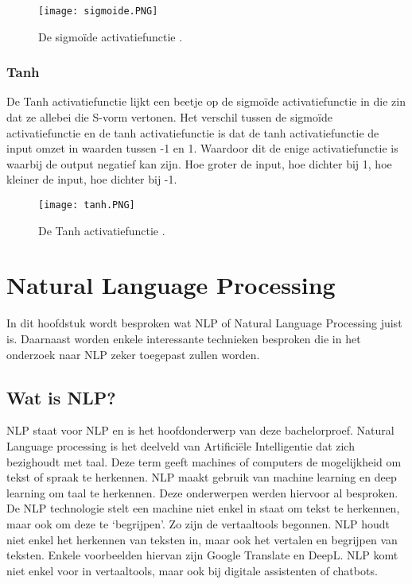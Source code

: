 \begin{figure}[!htbp]
    \texttt{[image: sigmoide.PNG]}
    \caption{\label{sigmoide}De sigmoïde activatiefunctie \autocite{Brownlee2021}.}
\end{figure}
\FloatBarrier


\subsubsection{Tanh}
\label{sec:tanh}

De \gls{Tanh} activatiefunctie lijkt een beetje op de sigmoïde activatiefunctie in die zin dat ze allebei die S-vorm vertonen. Het verschil tussen de sigmoïde activatiefunctie en de tanh activatiefunctie is dat de tanh activatiefunctie de input omzet in waarden tussen -1 en 1. Waardoor dit de enige activatiefunctie is waarbij de output negatief kan zijn. Hoe groter de input, hoe dichter bij 1, hoe kleiner de input, hoe dichter bij -1. \autocite{Brownlee2021}

\begin{figure}[!htbp]
    \texttt{[image: tanh.PNG]}
    \caption{\label{tanh}De Tanh activatiefunctie \autocite{Brownlee2021}.}
\end{figure}
\FloatBarrier


\section{Natural Language Processing}
\label{sec:NLP}

In dit hoofdstuk wordt besproken wat NLP of Natural Language Processing juist is. Daarnaast worden enkele interessante technieken besproken die in het onderzoek naar NLP zeker toegepast zullen worden. 

\subsection{Wat is NLP?}
\label{sec:WatisNLP}
NLP staat voor \gls{NLP} en is het hoofdonderwerp van deze bachelorproef. Natural Language processing is het deelveld van Artificiële Intelligentie dat zich bezighoudt met taal. Deze term geeft machines of computers de mogelijkheid om tekst of spraak te herkennen. NLP maakt gebruik van machine learning en deep learning om taal te herkennen. Deze onderwerpen werden hiervoor al besproken. De NLP technologie stelt een machine niet enkel in staat om tekst te herkennen, maar ook om deze te ‘begrijpen’. Zo zijn de vertaaltools begonnen. NLP houdt niet enkel het herkennen van teksten in, maar ook het vertalen en begrijpen van teksten. Enkele voorbeelden hiervan zijn Google Translate en DeepL. NLP komt niet enkel voor in vertaaltools, maar ook bij digitale assistenten of chatbots. \autocite{IBM2020}

